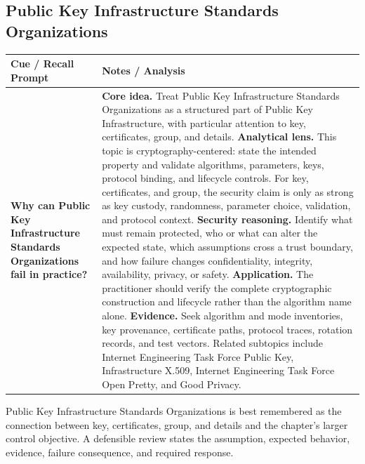\documentclass[11pt]{article}
\newcommand{\CornellHeader}{%
\rowcolor{Navy}\color{white}\bfseries Cue / Recall Prompt & \color{white}\bfseries Notes / Analysis\\\hline}
\newcommand{\CornellRow}[2]{%
\cellcolor{CueGray}\RaggedRight\textbf{#1} & \RaggedRight #2\\\hline}
\begin{document}
\subsection*{Public Key Infrastructure Standards Organizations}
\begin{longtable}{>{\RaggedRight\arraybackslash}p{}|>{\RaggedRight\arraybackslash}p{}}
\CornellHeader
\CornellRow{Why can Public Key Infrastructure Standards Organizations fail in practice?}{\textbf{Core idea.} Treat Public Key Infrastructure Standards Organizations as a structured part of Public Key Infrastructure, with particular attention to key, certificates, group, and details. \textbf{Analytical lens.} This topic is cryptography-centered: state the intended property and validate algorithms, parameters, keys, protocol binding, and lifecycle controls. For key, certificates, and group, the security claim is only as strong as key custody, randomness, parameter choice, validation, and protocol context. \textbf{Security reasoning.} Identify what must remain protected, who or what can alter the expected state, which assumptions cross a trust boundary, and how failure changes confidentiality, integrity, availability, privacy, or safety. \textbf{Application.} The practitioner should verify the complete cryptographic construction and lifecycle rather than the algorithm name alone. \textbf{Evidence.} Seek algorithm and mode inventories, key provenance, certificate paths, protocol traces, rotation records, and test vectors. Related subtopics include Internet Engineering Task Force Public Key, Infrastructure X.509, Internet Engineering Task Force Open Pretty, and Good Privacy.}
\end{longtable}
\begin{topicsummary}
Public Key Infrastructure Standards Organizations is best remembered as the connection between key, certificates, group, and details and the chapter's larger control objective. A defensible review states the assumption, expected behavior, evidence, failure consequence, and required response.
\end{topicsummary}
\end{document}
